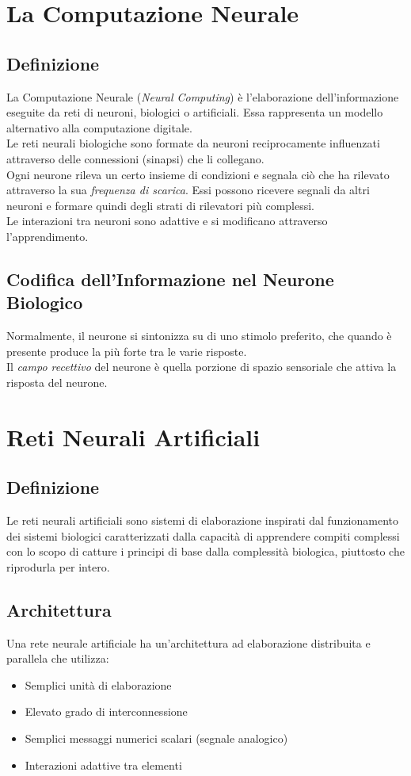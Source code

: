 \documentclass[12pt, a4paper]{article}
\begin{document}
\newpage
\section{La Computazione Neurale}

\subsection{Definizione}
La Computazione Neurale (\textit{Neural Computing}) è l'elaborazione dell'informazione eseguite da reti di neuroni, biologici o artificiali. Essa rappresenta un modello alternativo alla computazione digitale.\\
Le reti neurali biologiche sono formate da neuroni reciprocamente influenzati attraverso delle connessioni (sinapsi) che li collegano.\\
Ogni neurone rileva un certo insieme di condizioni e segnala ciò che ha rilevato attraverso la sua \textit{frequenza di scarica}. Essi possono ricevere segnali da altri neuroni e formare quindi degli strati di rilevatori più complessi.\\
Le interazioni tra neuroni sono adattive e si modificano attraverso l'apprendimento.

\subsection{Codifica dell'Informazione nel Neurone Biologico}
Normalmente, il neurone si sintonizza su di uno stimolo preferito, che quando è presente produce la più forte tra le varie risposte.\\
Il \textit{campo recettivo} del neurone è quella porzione di spazio sensoriale che attiva la risposta del neurone.

\newpage
\section{Reti Neurali Artificiali}

\subsection{Definizione}
Le reti neurali artificiali sono sistemi di elaborazione inspirati dal funzionamento dei sistemi biologici caratterizzati dalla capacità di apprendere compiti complessi con lo scopo di catture i principi di base dalla complessità biologica, piuttosto che riprodurla per intero.

\subsection{Architettura}
Una rete neurale artificiale ha un'architettura ad elaborazione distribuita e parallela che utilizza:
\begin{itemize}
    \item Semplici unità di elaborazione
    \item Elevato grado di interconnessione
    \item Semplici messaggi numerici scalari (segnale analogico)
    \item Interazioni adattive tra elementi
\end{itemize}
\end{document}
